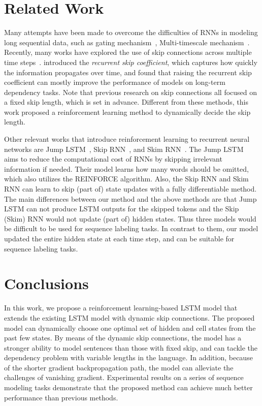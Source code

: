 \documentclass[letterpaper]{article} \usepackage{aaai19}  \usepackage{times}  \usepackage{helvet}  \usepackage{courier}  \usepackage{url}  \usepackage{graphicx}  \usepackage{amsmath}
\begin{document}
\section{Related Work}
Many attempts have been made to overcome the difficulties of RNNs in modeling long sequential data, such as gating mechanism~\cite{hochreiter1997long,chung2014empirical}, Multi-timescale mechanism~\cite{chung2016hierarchical}. Recently, many works have explored the use of skip connections across multiple time steps~\cite{zhang2016architectural,chang2017dilated}. \citeauthor{zhang2016architectural}  introduced the \textit{recurrent skip coefficient}, which captures how quickly the information propagates over time, and found that raising the recurrent skip coefficient can mostly improve the performance of models on long-term dependency tasks. Note that previous research on skip connections all focused on a fixed skip length, which is set in advance. Different from these methods, this work proposed a reinforcement learning method to dynamically decide the skip length.



Other relevant works that introduce reinforcement learning to recurrent neural networks are Jump LSTM~\cite{yu2017learning}, Skip RNN~\cite{seo2017neural}, and Skim RNN~\cite{seo2017neural}. The Jump LSTM aims to reduce the computational cost of RNNs by skipping irrelevant information if needed. Their model learns how many words should be omitted, which also utilizes the REINFORCE algorithm. Also, the Skip RNN and Skim RNN can learn to skip (part of) state updates with a fully differentiable method. The main differences between our method and the above methods are that Jump LSTM can not produce LSTM outputs for the skipped tokens and the Skip (Skim) RNN would not update (part of) hidden states. Thus three models would be difficult to be used for sequence labeling tasks. In contrast to them, our model updated the entire hidden state at each time step, and can be suitable for sequence labeling tasks.




\section{Conclusions}
In this work, we propose a reinforcement learning-based LSTM model that extends the existing LSTM model with dynamic skip connections. The proposed model can dynamically choose one optimal set of hidden and cell states from the past few states. By means of the dynamic skip connections, the model has a stronger ability to model sentences than those with fixed skip, and can tackle the dependency problem with variable lengths in the language. In addition, because of the shorter gradient backpropagation path, the model can alleviate the challenges of vanishing gradient. Experimental results on a series of sequence modeling tasks demonstrate that the proposed method can achieve much better performance than previous methods.
\end{document}
